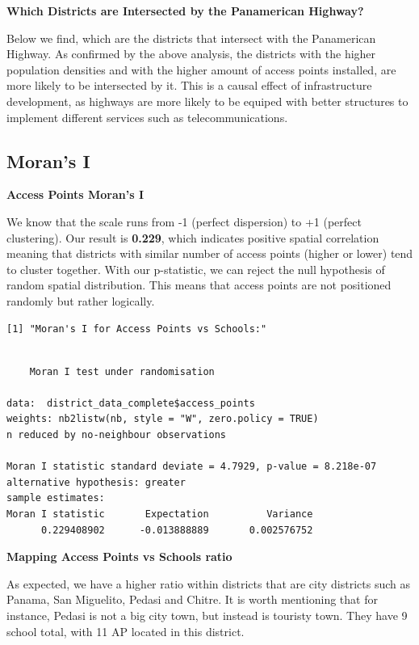 \documentclass[
  letterpaper,
  DIV=11,
  numbers=noendperiod]{scrartcl}
\begin{document}
\textbf{Which Districts are Intersected by the Panamerican Highway?}

Below we find, which are the districts that intersect with the
Panamerican Highway. As confirmed by the above analysis, the districts
with the higher population densities and with the higher amount of
access points installed, are more likely to be intersected by it. This
is a causal effect of infrastructure development, as highways are more
likely to be equiped with better structures to implement different
services such as telecommunications.

\subsection{Moran's I}\label{morans-i}

\textbf{Access Points Moran's I}

We know that the scale runs from -1 (perfect dispersion) to +1 (perfect
clustering). Our result is \textbf{0.229}, which indicates positive
spatial correlation meaning that districts with similar number of access
points (higher or lower) tend to cluster together. With our p-statistic,
we can reject the null hypothesis of random spatial distribution. This
means that access points are not positioned randomly but rather
logically.

\begin{verbatim}
[1] "Moran's I for Access Points vs Schools:"
\end{verbatim}

\begin{verbatim}

    Moran I test under randomisation

data:  district_data_complete$access_points  
weights: nb2listw(nb, style = "W", zero.policy = TRUE)  
n reduced by no-neighbour observations  

Moran I statistic standard deviate = 4.7929, p-value = 8.218e-07
alternative hypothesis: greater
sample estimates:
Moran I statistic       Expectation          Variance 
      0.229408902      -0.013888889       0.002576752 
\end{verbatim}

\textbf{Mapping Access Points vs Schools ratio}

As expected, we have a higher ratio within districts that are city
districts such as Panama, San Miguelito, Pedasi and Chitre. It is worth
mentioning that for instance, Pedasi is not a big city town, but instead
is touristy town. They have 9 school total, with 11 AP located in this
district.
\end{document}
